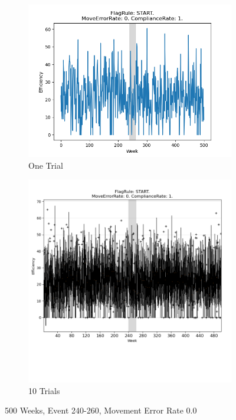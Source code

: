 \documentclass{article}%
\begin{document}
%


\begin{figure}[!htb]%
\begin{subfigure}[b]{0.45\linewidth}%
\includegraphics[width=\linewidth]{2001fr_START_er_0_cr_1_t1.png}%
\caption{One Trial}%
\end{subfigure}%
\begin{subfigure}[b]{0.45\linewidth}%
\includegraphics[clip,width=\linewidth,trim=0 4cm 0 0]{2001fr_START_er_0_cr_1_t10.png}%
\caption{10 Trials}%
\end{subfigure}%
\caption{500 Weeks, Event 240{-}260, Movement Error Rate 0.0}%
\end{figure}
\end{document}
